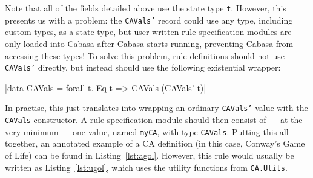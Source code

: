 \documentclass[oneside,a4paper]{memoir}
\begin{document}
Note that all of the fields detailed above use the state type \texttt{t}.
However, this presents us with a problem:
  the \texttt{CAVals'} record could use any type, including custom types, as a state type,
  but user-written rule specification modules
  are only loaded into Cabasa after Cabasa starts running,
  preventing Cabasa from accessing these types!
To solve this problem, rule definitions should not use \texttt{CAVals'} directly,
  but instead should use the following existential wrapper:

|data CAVals = forall t. Eq t => CAVals (CAVals' t)|

In practise, this just translates into
  wrapping an ordinary \texttt{CAVals'} value with the \texttt{CAVals} constructor.
A rule specification module should then consist of
  --- at the very minimum ---
  one value, named \texttt{myCA}\footnotemark, with type \texttt{CAVals}.
Putting this all together,
  an annotated example of a CA definition (in this case, Conway's Game of Life) can be found in Listing~\ref{lst:agol}.
However, this rule would usually be written as Listing~\ref{lst:ugol},
  which uses the utility functions from \texttt{CA.Utils}.

\end{document}
